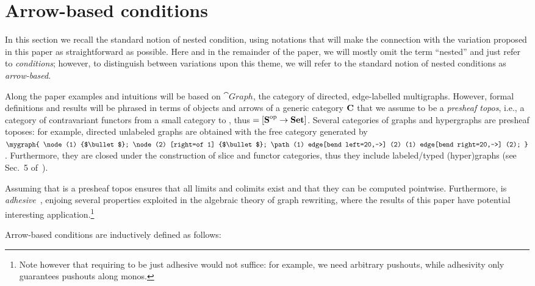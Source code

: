 \section{Arrow-based conditions}

In this section we recall the standard notion of nested condition, using notations that will make the connection with the variation proposed in this paper as straightforward as possible. Here and in the remainder of the paper, we will mostly omit the term ``nested'' and just refer to \emph{conditions}; however, to distinguish between variations upon this theme, we will refer to the standard notion of nested conditions as \emph{arrow-based}.

Along the paper examples and intuitions will be based on $\cat{Graph}$, the category of directed, edge-labelled multigraphs. However, formal definitions and results will be phrased in terms of objects and arrows of a generic category $\mathbf{C}$ that we assume to be a \emph{presheaf topos}, i.e., a category of contravariant functors from a small category  to , thus  $= [\mbox{\textbf{S}}^{\mathrm{op}} \rightarrow \textbf{Set}]$. Several categories of graphs and hypergraphs are presheaf toposes: for example, directed unlabeled graphs are obtained with  the free category generated by $\mygraph{
  \node (1) {$\bullet$};
  \node (2) [right=of 1] {$\bullet$};
  \path (1) edge[bend left=20,->] (2)
        (1) edge[bend right=20,->] (2);
}$. Furthermore, they are closed under the construction of slice and functor categories, thus they include labeled/typed (hyper)graphs (see Sec.~5 of~\cite{AzziCR19}). 

Assuming that  is a presheaf topos ensures that all limits and colimits exist and that they can be computed pointwise. Furthermore,  is \emph{adhesive}~\cite{ls:adhesive-journal}, enjoing several properties exploited in the algebraic theory of graph rewriting, where the results of this paper have potential interesting application.\footnote{Note however that requiring  to be just adhesive would not suffice: for example, we need arbitrary pushouts, while adhesivity only guarantees pushouts along monos.}

\medskip\noindent
Arrow-based conditions are inductively defined as follows:

